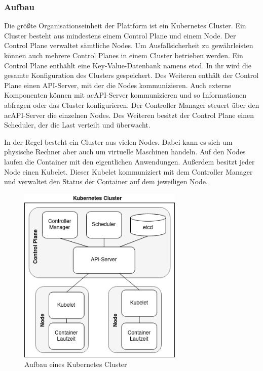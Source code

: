 \subsubsection{Aufbau}

Die größte Organisationseinheit der Plattform ist ein Kubernetes Cluster. Ein Cluster besteht aus mindestens einem Control Plane und einem Node. Der Control Plane verwaltet sämtliche Nodes. Um Ausfallsicherheit zu gewährleisten können auch mehrere Control Planes in einem Cluster betrieben werden. Ein Control Plane enthählt eine Key-Value-Datenbank namens etcd. In ihr wird die gesamte Konfiguration des Clusters gespeichert. Des Weiteren enthält der Control Plane einen \ac{API}-Server, mit der die Nodes kommunizieren. Auch externe Komponenten können mit ac{API}-Server kommunizieren und so Informationen abfragen oder das Cluster konfigurieren. Der Controller Manager steuert über den ac{API}-Server die einzelnen Nodes. Des Weiteren besitzt der Control Plane einen Scheduler, der die Last verteilt und überwacht.

In der Regel besteht ein Cluster aus vielen Nodes. Dabei kann es sich um physische Rechner aber auch um virtuelle Maschinen handeln. Auf den Nodes laufen die Container mit den eigentlichen Anwendungen. Außerdem besitzt jeder Node einen Kubelet. Dieser Kubelet kommuniziert mit dem Controller Manager und verwaltet den Status der Container auf dem jeweiligen Node.

\begin{figure}[H] 
    \centering
    \includegraphics[width=0.70\textwidth]{figures/KubernetesCluster.png}
    \caption{Aufbau eines Kubernetes Cluster}
\end{figure}

